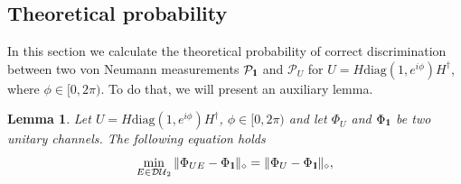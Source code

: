 \documentclass[preprint,12pt, a4paper]{elsarticle}
\newcommand{\1}{{\rm 1\hspace{-0.9mm}l}}
\newcommand{\Id}{{\rm 1\hspace{-0.9mm}l}}
\newcommand{\PP}{\mathcal{P}}
\newcommand{\diaguni}{\ensuremath{\mathcal{DU}}}
\newcommand{\diag}{\mathrm{diag}}
\newtheorem{lemma}{Lemma}
\begin{document}
\subsection{Theoretical probability}\label{sec:example_theoretical_probability}
In this section we calculate the theoretical probability of correct discrimination between two von Neumann measurements $\PP_\1$ and $\PP_U$ for $U = H \diag(1, e^{i \phi}) H^\dagger$, where  $\phi \in [0, 2\pi)$. To do that, we will present an auxiliary lemma.   
\begin{lemma}\label{lemma:min-e-optimal}
	Let $U = H \diag(1, e^{i \phi}) H^\dagger$, $\phi \in [0, 2\pi)$ and	let 
	$\Phi_U$ and $\Phi_\Id$ be two unitary channels. The following equation holds 
	\begin{equation}
	\min_{E \in \diaguni_2} \|\Phi_{UE} - 
	\Phi_\Id\|_\diamond = \|\Phi_{U} - 
	\Phi_\Id\|_\diamond,
	\end{equation}
	
\end{lemma}
\end{document}
